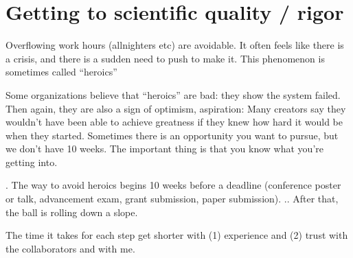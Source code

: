 \documentclass[letterpaper,10pt,english]{sphinxmanual}
\begin{document}
\section{Getting to scientific quality / rigor}
\label{\detokenize{02Elements:getting-to-scientific-quality-rigor}}
\sphinxAtStartPar
Overflowing work hours (all\sphinxhyphen{}nighters etc) are avoidable.
It often feels like there is a crisis, and there is a sudden need to push to make it.
This phenomenon is sometimes called “heroics” \sphinxstepexplicit %
\begin{footnote}[1]\label{\thesphinxscope.1}%
\sphinxAtStartFootnote
Some organizations believe that “heroics” are bad: they show the system failed. Then again, they are also a sign of optimism, aspiration: Many creators say they wouldn’t have been able to achieve greatness if they knew how hard it would be when they started. Sometimes there is an opportunity you want to pursue, but we don’t have 10 weeks. The important thing is that you know what you’re getting into.
%
\end{footnote} .
The way to avoid heroics begins 10 weeks before a deadline (conference poster or talk, advancement exam, grant submission, paper submission).
.. After that, the ball is rolling down a slope.

\sphinxAtStartPar
The time it takes for each step get shorter with (1) experience and (2) trust with the collaborators and with me.
\end{document}
